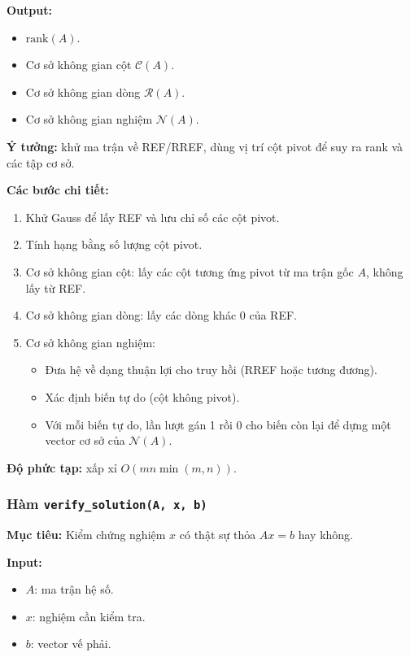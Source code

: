 \documentclass[a4paper]{article}
\begin{document}
\textbf{Output:}
\begin{itemize}
    \item \(\mathrm{rank}(A)\).
    \item Cơ sở không gian cột \(\mathcal{C}(A)\).
    \item Cơ sở không gian dòng \(\mathcal{R}(A)\).
    \item Cơ sở không gian nghiệm \(\mathcal{N}(A)\).
\end{itemize}

\textbf{Ý tưởng:} khử ma trận về REF/RREF, dùng vị trí cột pivot để suy ra rank và các tập cơ sở.

\textbf{Các bước chi tiết:}
\begin{enumerate}
    \item Khử Gauss để lấy REF và lưu chỉ số các cột pivot.
    \item Tính hạng bằng số lượng cột pivot.
    \item Cơ sở không gian cột: lấy các cột tương ứng pivot từ ma trận gốc \(A\), không lấy từ REF.
    \item Cơ sở không gian dòng: lấy các dòng khác 0 của REF.
    \item Cơ sở không gian nghiệm:
    \begin{itemize}
        \item Đưa hệ về dạng thuận lợi cho truy hồi (RREF hoặc tương đương).
        \item Xác định biến tự do (cột không pivot).
        \item Với mỗi biến tự do, lần lượt gán 1 rồi 0 cho biến còn lại để dựng một vector cơ sở của \(\mathcal{N}(A)\).
    \end{itemize}
\end{enumerate}

\textbf{Độ phức tạp:} xấp xỉ \(O(mn\min(m,n))\).

\subsubsection{Hàm \texttt{verify\_solution(A, x, b)}}
\textbf{Mục tiêu:} Kiểm chứng nghiệm \(x\) có thật sự thỏa \(Ax=b\) hay không.

\textbf{Input:}
\begin{itemize}
    \item \(A\): ma trận hệ số.
    \item \(x\): nghiệm cần kiểm tra.
    \item \(b\): vector vế phải.
\end{itemize}
\end{document}
